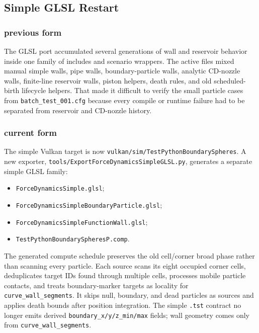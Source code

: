\subsection{Simple GLSL Restart}

\subsubsection{previous form}

The GLSL port accumulated several generations of wall and reservoir behavior
inside one family of includes and scenario wrappers.  The active files mixed
manual simple walls, pipe walls, boundary-particle walls, analytic CD-nozzle
walls, finite-line reservoir walls, piston helpers, death rules, and old
scheduled-birth lifecycle helpers.  That made it difficult to verify the
small particle cases from \texttt{batch\_test\_001.cfg} because every compile
or runtime failure had to be separated from reservoir and CD-nozzle history.

\subsubsection{current form}

The simple Vulkan target is now
\texttt{vulkan/sim/TestPythonBoundarySpheres}.  A new exporter,
\texttt{tools/ExportForceDynamicsSimpleGLSL.py}, generates a separate simple
GLSL family:
\begin{itemize}
    \item \texttt{ForceDynamicsSimple.glsl};
    \item \texttt{ForceDynamicsSimpleBoundaryParticle.glsl};
    \item \texttt{ForceDynamicsSimpleFunctionWall.glsl};
    \item \texttt{TestPythonBoundarySpheresP.comp}.
\end{itemize}

The generated compute schedule preserves the old cell/corner broad phase
rather than scanning every particle.  Each source scans its eight occupied
corner cells, deduplicates target IDs found through multiple cells, processes
mobile particle contacts, and treats boundary-marker targets as locality for
\texttt{curve\_wall\_segments}.  It skips null, boundary, and dead particles
as sources and applies death bounds after position integration.  The simple
\texttt{.tst} contract no longer emits derived
\texttt{boundary\_x/y/z\_min/max} fields; wall geometry comes only from
\texttt{curve\_wall\_segments}.

